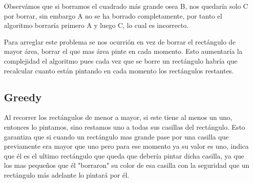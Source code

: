 \documentclass{article}
\begin{document}
Observámos que si borramos el cuadrado más grande osea B, nos quedaría solo C por borrar, sin embargo A no se ha borrado completamente, por tanto el algoritmo borraría primero A y luego C, lo cual es incorrecto.\\

\begin{center}


\end{center}


Para arreglar este problema se nos ocurrión en vez de borrar el rectángulo de mayor área, borrar el que mas área pinte en cada momento. Esto aumentaría la complejidad el algoritmo pues cada vez que se borre un rectángulo habría que recalcular cuanto están pintando en cada momento los rectángulos restantes.

\subsection{Greedy}
Al recorrer los rectángulos de menor a mayor, si este tiene al menos un uno, entonces lo pintamos, sino restamos uno a todas sus casillas del rectángulo. Esto garantiza que si cuando un rectángulo mas grande pase por una casilla que previamente era mayor que uno pero para ese momento ya su valor es uno, indica que él es el ultimo rectángulo que queda que debería pintar dicha casilla, ya que los mas pequeños que él "borraron" su color de esa casilla con la seguridad que un rectángulo más adelante lo pintará por él.
\end{document}
